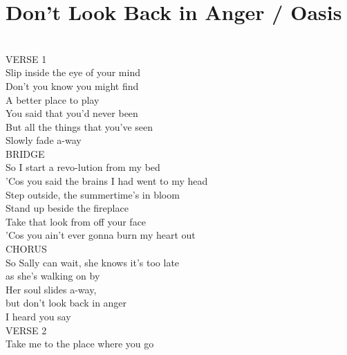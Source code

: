 \section{Don't Look Back in Anger / Oasis}\label{sec:dontlookbackinanger}
\Cmajor
\Fmajor
\Gmajor
\Aminor
\Eseven
\Fminor

   \\
VERSE 1\\
 Slip inside the  eye of your  mind\\
Don't you  know you might  find \\
A better place to  play   \\
 You said that  you'd never  been\\
But all the  things that you've  seen \\
Slowly fade a-way    \\
BRIDGE\\
 So I start a revo-lution from my  bed\\
'Cos you  said the brains I  had went to my  head\\
 Step outside, the  summertime's in  bloom\\
 Stand up beside the fireplace\\
 Take that look from off your face\\
'Cos  you ain't ever  gonna burn my  heart out \\
CHORUS\\
 So  Sally can  wait, she  knows it's too  late\\
as she's  walking on  by   \\
Her  soul  slides a-way, \\
but don't look  back in anger \\
I heard you  say            \\
VERSE 2\\
 Take me to the  place where you  go\\
